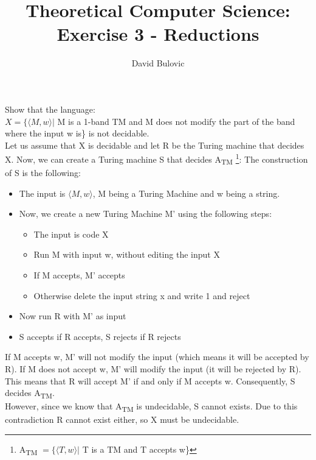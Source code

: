 \documentclass{article}
\title {Theoretical Computer Science: Exercise 3 - Reductions}
\author {David Bulovic}
\date {}
\begin{document}
\maketitle

Show that the language: \\
\begin{math} X = \{ \langle M,w \rangle | \end{math} 
M is a 1-band TM and M does not modify the part of the band where the input w is\} 
is not decidable. \\

Let us assume that X is decidable and let R be the Turing machine that decides X. Now, we can create a Turing machine 
S that decides A\textsubscript{TM}
\footnote{A\textsubscript{TM} \begin{math} = \{ \langle T,w \rangle | \end{math} T is a TM and T accepts w\}}:
The construction of S is the following:
\begin{itemize}
\item The input is \begin{math}\langle M,w \rangle\end{math}, M being a Turing Machine and w being a string.
\item Now, we create a new Turing Machine M' using the following steps:
\begin{itemize}
\item The input is code X
\item Run M with input w, without editing the input X
\item If M accepts, M' accepts
\item Otherwise delete the input string x and write 1 and reject
\end{itemize}
\item Now run R with M' as input
\item S accepts if R accepts, S rejects if R rejects
\end{itemize}
If M accepts w, M' will not modify the input (which means it will be accepted by R). If M does not accept w, M' will modify the input
(it will be rejected by R). This means that R will accept M' if and only if M accepts w. Consequently, S decides A\textsubscript{TM}.\\

However, since we know that A\textsubscript{TM} is undecidable, S cannot exists. 
Due to this contradiction R cannot exist either, so X must be undecidable.
\end{document}
